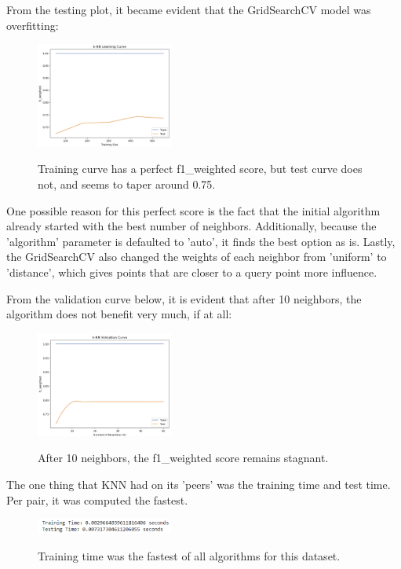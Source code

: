 \documentclass[conference]{IEEEtran}
\begin{document}
From the testing plot, it became evident that the GridSearchCV model was overfitting: 

\begin{figure}[H]
    \centering
    \includegraphics[width=0.40\textwidth]{PIMA Indian Diabetes Graphs/KNN/knn fin lc.png}
    \label{fig:enter-label}
    \caption{Training curve has a perfect f1\_weighted score, but test curve does not, and seems to taper around 0.75.}
\end{figure}

One possible reason for this perfect score is the fact that the initial algorithm already started with the best number of neighbors. Additionally, because the 'algorithm' parameter is defaulted to 'auto', it finds the best option as is. Lastly, the GridSearchCV also changed the weights of each neighbor from 'uniform' to 'distance', which gives points that are closer to a query point more influence. 

From the validation curve below, it is evident that after 10 neighbors, the algorithm does not benefit very much, if at all: 

\begin{figure}[H]
    \centering
    \includegraphics[width=0.40\textwidth]{PIMA Indian Diabetes Graphs/KNN/knn vc.png}
    \label{fig:enter-label}
    \caption{After 10 neighbors, the f1\_weighted score remains stagnant.}
\end{figure}

The one thing that KNN had on its 'peers' was the training time and test time. Per pair, it was computed the fastest. 

\begin{figure}[H]
    \centering
    \includegraphics[width=0.40\textwidth]{PIMA Indian Diabetes Graphs/KNN/knn wct.png}
    \label{fig:enter-label}
    \caption{Training time was the fastest of all algorithms for this dataset.}
\end{figure}
\end{document}
